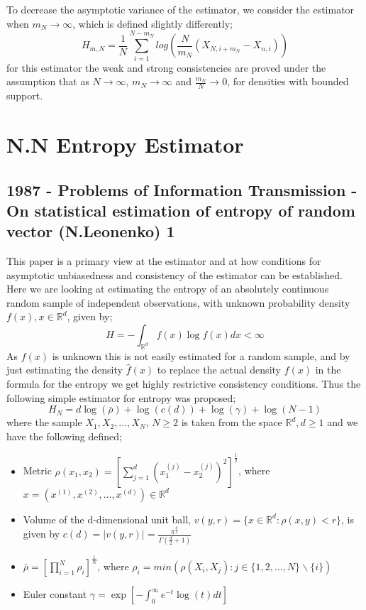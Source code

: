 \documentclass{article}
\begin{document}
To decrease the asymptotic variance of the estimator, we consider the estimator when $m_{N} \to \infty$, which is defined slightly differently;
\begin{equation}
H_{m, N} = \frac{1}{N} \sum_{i=1}^{N-m_{N}} log \left(\frac{N}{m_{N}} (X_{N, i+m_{N}} - X_{n, i}) \right)
\end{equation}
for this estimator the weak and strong consistencies are proved under the assumption that as $N \to \infty$, $m_{N} \to \infty$ and $\frac{m_{N}}{N} \to 0$, for densities with bounded support.








\section{N.N Entropy Estimator}

\subsection{1987 - Problems of Information Transmission - On statistical estimation of entropy of random vector (N.Leonenko) 1}

This paper is a primary view at the estimator and at how conditions for asymptotic unbiasedness and consistency of the estimator can be established. Here we are looking at estimating the entropy of an absolutely continuous random sample of independent observations, with unknown probability density $f(x), x \in \mathbb{R}^{d}$, given by;
\begin{equation}
H = - \int_{\mathbb{R}^{d}} f (x) \log f(x) dx < \infty
\end{equation}
As $f(x)$ is unknown this is not easily estimated for a random sample, and by just estimating the density $\hat{f}(x)$ to replace the actual density $f(x)$ in the formula for the entropy we get highly restrictive consistency conditions. Thus the following simple estimator for entropy was proposed;
\begin{equation}
H_{N} = d \log(\bar{\rho } ) + \log (c(d)) + \log (\gamma) + \log (N-1)
\end{equation}
where the sample $X_{1}, X_{2}, ..., X_{N}$, $N\geq 2$ is taken from the space $\mathbb{R}^{d}, d \geq 1$ and we have the following defined;
\begin{itemize}
\item Metric $\rho (x_{1}, x_{2}) = \left[ \sum_{j=1}^{d} (x_{1}^{(j)} - x_{2}^{(j)} )^{2} \right]^{\frac{1}{2}}$, where $x = (x^{(1)}, x^{(2)}, ..., x^{(d)}) \in \mathbb{R}^{d}$
\item Volume of the d-dimensional unit ball, $v(y, r) = \{ x \in \mathbb{R}^{d} : \rho (x, y) < r \}$, is given by $c(d) = |v(y, r)| = \frac{\pi^{\frac{d}{2}}}{\Gamma ( \frac{d}{2} + 1 )}$
\item $\bar{\rho} = \left[ \prod_{i=1}^{N} \rho_{i} \right]^{\frac{1}{N}}$, where $\rho_{i} = min(\rho (X_{i}, X_{j}) : j \in \{1, 2, ..., N\} \backslash \{i\})$
\item Euler constant $\gamma = \exp \left[ - \int_{0}^{\infty} e^{-t} \log(t) dt \right]$
\end{itemize}
\end{document}

